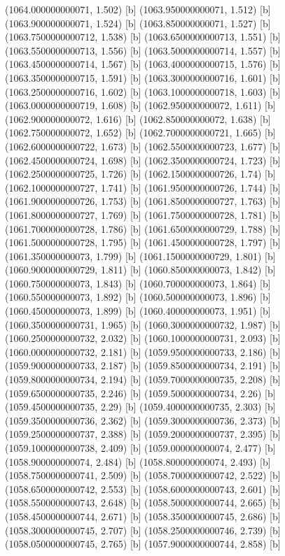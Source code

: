 {{{(1064.000000000071, 1.502) [b] 
(1063.950000000071, 1.512) [b] 
(1063.900000000071, 1.524) [b] 
(1063.850000000071, 1.527) [b] 
(1063.7500000000712, 1.538) [b] 
(1063.6500000000713, 1.551) [b] 
(1063.5500000000713, 1.556) [b] 
(1063.5000000000714, 1.557) [b] 
(1063.4500000000714, 1.567) [b] 
(1063.4000000000715, 1.576) [b] 
(1063.3500000000715, 1.591) [b] 
(1063.3000000000716, 1.601) [b] 
(1063.2500000000716, 1.602) [b] 
(1063.1000000000718, 1.603) [b] 
(1063.0000000000719, 1.608) [b] 
(1062.950000000072, 1.611) [b] 
(1062.900000000072, 1.616) [b] 
(1062.850000000072, 1.638) [b] 
(1062.750000000072, 1.652) [b] 
(1062.7000000000721, 1.665) [b] 
(1062.6000000000722, 1.673) [b] 
(1062.5500000000723, 1.677) [b] 
(1062.4500000000724, 1.698) [b] 
(1062.3500000000724, 1.723) [b] 
(1062.2500000000725, 1.726) [b] 
(1062.1500000000726, 1.74) [b] 
(1062.1000000000727, 1.741) [b] 
(1061.9500000000726, 1.744) [b] 
(1061.9000000000726, 1.753) [b] 
(1061.8500000000727, 1.763) [b] 
(1061.8000000000727, 1.769) [b] 
(1061.7500000000728, 1.781) [b] 
(1061.7000000000728, 1.786) [b] 
(1061.6500000000729, 1.788) [b] 
(1061.5000000000728, 1.795) [b] 
(1061.4500000000728, 1.797) [b] 
(1061.350000000073, 1.799) [b] 
(1061.1500000000729, 1.801) [b] 
(1060.9000000000729, 1.811) [b] 
(1060.850000000073, 1.842) [b] 
(1060.750000000073, 1.843) [b] 
(1060.700000000073, 1.864) [b] 
(1060.550000000073, 1.892) [b] 
(1060.500000000073, 1.896) [b] 
(1060.450000000073, 1.899) [b] 
(1060.400000000073, 1.951) [b] 
(1060.3500000000731, 1.965) [b] 
(1060.3000000000732, 1.987) [b] 
(1060.2500000000732, 2.032) [b] 
(1060.1000000000731, 2.093) [b] 
(1060.0000000000732, 2.181) [b] 
(1059.9500000000733, 2.186) [b] 
(1059.9000000000733, 2.187) [b] 
(1059.8500000000734, 2.191) [b] 
(1059.8000000000734, 2.194) [b] 
(1059.7000000000735, 2.208) [b] 
(1059.6500000000735, 2.246) [b] 
(1059.5000000000734, 2.26) [b] 
(1059.4500000000735, 2.29) [b] 
(1059.4000000000735, 2.303) [b] 
(1059.3500000000736, 2.362) [b] 
(1059.3000000000736, 2.373) [b] 
(1059.2500000000737, 2.388) [b] 
(1059.2000000000737, 2.395) [b] 
(1059.1000000000738, 2.409) [b] 
(1059.000000000074, 2.477) [b] 
(1058.900000000074, 2.484) [b] 
(1058.800000000074, 2.493) [b] 
(1058.7500000000741, 2.509) [b] 
(1058.7000000000742, 2.522) [b] 
(1058.6500000000742, 2.553) [b] 
(1058.6000000000743, 2.601) [b] 
(1058.5500000000743, 2.648) [b] 
(1058.5000000000744, 2.665) [b] 
(1058.4500000000744, 2.671) [b] 
(1058.3500000000745, 2.686) [b] 
(1058.3000000000745, 2.707) [b] 
(1058.2500000000746, 2.739) [b] 
(1058.0500000000745, 2.765) [b] 
(1057.9000000000744, 2.858) [b] 
}}}
